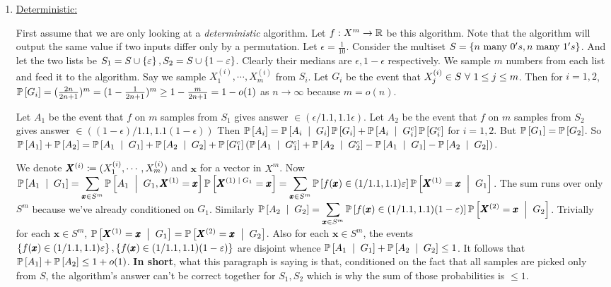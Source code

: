 \soln
\begin{enumerate}[leftmargin = *, label=(\alph*)]
\item \underline{Deterministic:}

First assume that we are only looking at a \textit{deterministic} algorithm. Let $f:X^{m}\to\R$ be this algorithm. Note that the algorithm will output the same value if two inputs differ only by a permutation. Let $\epsilon=\frac{1}{10}$. Consider the multiset $S=\set{n \text{ many } 0's, n \text{ many } 1's}$. And let the two lists be $S_{1}=S\cup\set{\epsilon}, S_{2} = S\cup \set{1-\epsilon}$. Clearly their medians are $\epsilon,1-\epsilon$ respectively. We sample $m$ numbers from each list and feed it to the algorithm. Say we sample $X_{1}^{(i)},\cdots,X_{m}^{(i)}$ from $S_{i}$. Let $G_{i}$ be the event that $X_{j}^{(i)}\in S\fa 1\le j\le m$. Then for $i=1,2$, $\P{G_{i}} = (\frac{2n}{2n+1})^{m} = (1-\frac{1}{2n+1})^{m} \ge 1-\frac{m}{2n+1}= 1-o(1)$ as $n\to \infty$ because $m=o(n)$.

Let $A_{1}$ be the event that $f$ on $m$ samples from $S_{1}$ gives answer $\in (\epsilon/1.1,1.1\epsilon)$. Let $A_{2}$ be the event that $f$ on $m$ samples from $S_{2}$ gives answer $\in ((1-\epsilon)/1.1,1.1(1-\epsilon))$ Then $\P{A_{i}} = \P{A_{i}\st G_{i}}\P{G_{i}} + \P{A_{i}\st G_{i}^{c}}\P{G_{i}^{c}}$ for $i=1,2$. But $\P{G_{1}}=\P{G_{2}}$. %
So $\P{A_{1}}+\P{A_{2}} = \P{A_{1}\st G_{1}}+\P{A_{2}\st G_{2}} + \\\P{G_{1}^{c}}\left(\P{A_{1}\st G_{1}^{c}} + \P{A_{2}\st G_{2}^{c}} - \P{A_{1}\st G_{1}}-\P{A_{2}\st G_{2}}\right).$ 

We denote $\pmb X^{(i)} \sett (X_{1}^{(i)},\cdots,X_{m}^{(i)})$ and $\pmb x$ for a vector in $X^{m}$. Now $\ds\P{A_{1}\st G_{1}} = \sum_{\pmb x\in S^{m}} \P{A_{1}\st G_{1}, \pmb X^{(1)}=\pmb x}\P{\pmb X^{(1)\st G_{1}} = \pmb x} = \sum_{\pmb x\in S^{m}} \P{f(\pmb x)\in (1/1.1,1.1)\epsilon}\P{\pmb X^{(1)} = \pmb x\st G_{1}}$. The sum runs over only $S^{m}$ because we've already conditioned on $G_{1}$. Similarly $\ds\P{A_{2}\st G_{2}} = \sum_{\pmb x\in S^{m}} \P{f(\pmb x)\in (1/1.1,1.1)(1-\epsilon)}\P{\pmb X^{(2)} = \pmb x\st G_{2}}$. Trivially for each $\pmb x\in S^{m}$, $\P{\pmb X^{(1)} = \pmb x\st G_{1}} = \P{\pmb X^{(2)} = \pmb x\st G_{2}}$. Also for each $\pmb x\in S^{m}$, the events $\set{f(\pmb x)\in (1/1.1,1.1)\epsilon},\set{f(\pmb x)\in (1/1.1,1.1)(1-\epsilon)}$ are disjoint whence $\P{A_{1}\st G_{1}} + \P{A_{2}\st G_{2}} \le 1$. It follows that $\P{A_{1}}+\P{A_{2}}\le 1+ o(1)$. \textbf{In short}, what this paragraph is saying is that, conditioned on the fact that all samples are picked only from $S$, the algorithm's answer can't be correct together for $S_{1},S_{2}$ which is why the sum of those probabilities is $\le 1$.


\end{enumerate}
